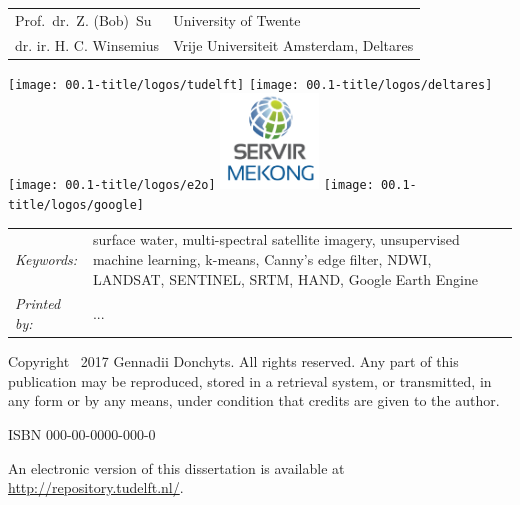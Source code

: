 \begin{titlepage}
\begin{tabular}{p{5cm}l}
	Prof.\ dr.\ Z. (Bob)\ Su & University of Twente \\
		
	dr. ir. H. C. Winsemius & Vrije Universiteit Amsterdam, Deltares \\
	
\end{tabular}

\medskip

\vfill

\begin{center}
	\texttt{[image: 00.1-title/logos/tudelft]}
	\hspace{1em} 
	\texttt{[image: 00.1-title/logos/deltares]}
	\hspace{1em} \vspace{1em} 
	\texttt{[image: 00.1-title/logos/e2o]} 
	\hspace{1em}
	\includegraphics[height=1.0in]{00.1-title/logos/SERVIR-Mekong} 
	\hspace{1em}
	\texttt{[image: 00.1-title/logos/google]} 
\end{center}
\vfill

\noindent
\begin{tabular}{@{}p{}@{}p{}}
	\textit{Keywords:} & {surface water, multi-spectral satellite imagery, unsupervised machine learning, k-means, Canny's edge filter, NDWI, LANDSAT, SENTINEL, SRTM, HAND, Google Earth Engine} \\[\medskipamount]
	
	\textit{Printed by:} & ... \\[\medskipamount]
\end{tabular}

\vspace{4\bigskipamount}

\noindent Copyright \textcopyright\ 2017 Gennadii Donchyts. All rights reserved. Any part of this publication may be reproduced, stored in a retrieval system, or transmitted, in any form or by any means, under condition that credits are given to the author.

\medskip
\noindent ISBN 000-00-0000-000-0

\medskip
\noindent An electronic version of this dissertation is available at \\
\url{http://repository.tudelft.nl/}.

\end{titlepage}

